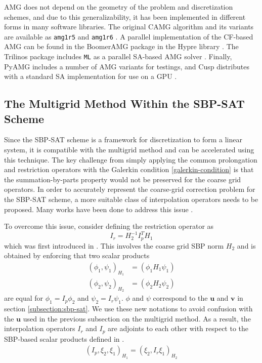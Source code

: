 AMG does not depend on the geometry of the problem and discretization schemes, and due to this generalizability, it has been implemented in different forms in many software libraries. The original CAMG algorithm and its variants are available as \texttt{amg1r5} and \texttt{amg1r6} \cite{ruge1987algebraic}. A parallel implementation of the CF-based AMG can be found in the BoomerAMG package in the Hypre library \cite{yang2002boomeramg}. The Trilinos package includes \texttt{ML} as a parallel SA-based AMG solver \cite{gee2006ml}. Finally, PyAMG includes a number of AMG variants for testings, and Cusp distributes with a standard SA implementation for use on a GPU \cite{dalton2014cusp,bell2022pyamg}. 

\subsection{The Multigrid Method Within the SBP-SAT Scheme}
Since the SBP-SAT scheme is a framework for discretization to form a linear system, it is compatible with the multigrid method and can be accelerated using this technique. The key challenge from simply applying the common prolongation and restriction operators with the Galerkin condition \autoref{galerkin-condition} is that the summation-by-parts property would not be preserved for the coarse grid operators. In order to accurately represent the coarse-grid correction problem for the SBP-SAT scheme, a more suitable class of interpolation operators needs to be proposed. Many works have been done to address this issue \cite{ruggiu2018new,RUGGIU2018216}.

To overcome this issue, consider defining the restriction operator as 
\begin{equation}
    I_r = H_2^{-1}I_p^TH_1
    \label{eqn:interpolation_sbp}
\end{equation}
which was first introduced in \cite{RUGGIU2018216}. This involves the coarse grid SBP norm $H_2$ and is obtained by enforcing that two scalar products
\begin{align}
    (\phi_1,\psi_1)_{H_1} &= (\phi_1H_1\psi_1) \\
     (\phi_2,\psi_2)_{H_2} &= (\phi_2H_2\psi_2)
\end{align}
are equal for $\phi_1 = I_p\phi_2$ and $\psi_2 = I_r \psi_1$. $\phi$ and $\psi$ correspond to the $\boldsymbol{u}$ and $\boldsymbol{v}$ in section \ref{subsection:sbp-sat}. We use these new notations to avoid confusion with the $\mathbf{u}$ used in the previous subsection on the multigrid method. As a result, the interpolation operators $I_r$ and $I_p$ are adjoints to each other with respect to the SBP-based scalar products defined in \cite{hackbusch2013multi}.
\begin{align}
    (I_p,\xi_2,\xi_1)_{H_1} = (\xi_2,I_r\xi_1)_{H_2}
    \label{eqn:adjoint}
\end{align}

